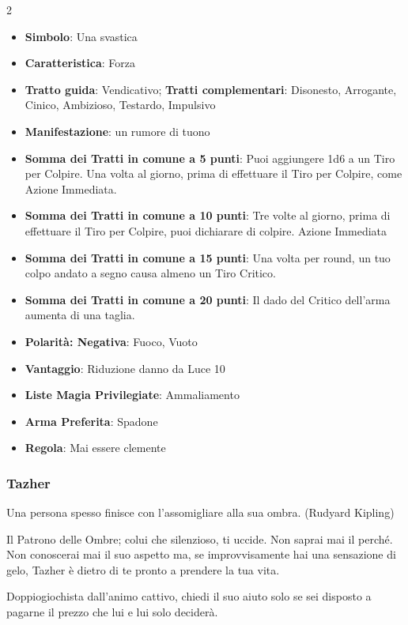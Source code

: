 \begin{multicols}{2}
\begin{itemize}[leftmargin=*] \setlength{\itemsep}{0pt}
\item \textbf{Simbolo}: Una svastica
\item \textbf{Caratteristica}: Forza
\item \textbf{Tratto guida}: Vendicativo; \textbf{Tratti complementari}: Disonesto, Arrogante, Cinico, Ambizioso, Testardo, Impulsivo
\item \textbf{Manifestazione}: un rumore di tuono
\item \textbf{Somma dei Tratti in comune a 5 punti}: Puoi aggiungere 1d6 a un Tiro per Colpire. Una volta al giorno, prima di effettuare il Tiro per Colpire, come Azione Immediata.
\item \textbf{Somma dei Tratti in comune a 10 punti}: Tre volte al giorno, prima di effettuare il Tiro per Colpire, puoi dichiarare di colpire. Azione Immediata
\item \textbf{Somma dei Tratti in comune a 15 punti}: Una volta per round, un tuo colpo andato a segno causa almeno un Tiro Critico.
\item \textbf{Somma dei Tratti in comune a 20 punti}: Il dado del Critico dell'arma aumenta di una taglia.
\item \textbf{Polarità: Negativa}: Fuoco, Vuoto
\item \textbf{Vantaggio}: Riduzione danno da Luce 10
\item \textbf{Liste Magia Privilegiate}: Ammaliamento
\item \textbf{Arma Preferita}: Spadone
\item \textbf{Regola}: Mai essere clemente
\end{itemize}

\subsubsection{Tazher}\label{tazher}\hypertarget{tazher}{}

\begin{enfasi}{
Una persona spesso finisce con l'assomigliare alla sua ombra. (Rudyard Kipling)
}\end{enfasi}

Il Patrono delle Ombre; colui che silenzioso, ti uccide. Non saprai mai il perché. Non conoscerai mai il suo aspetto ma, se improvvisamente hai una sensazione di gelo, Tazher è dietro di te pronto a prendere la tua vita.

Doppiogiochista dall'animo cattivo, chiedi il suo aiuto solo se sei disposto a pagarne il prezzo che lui e lui solo deciderà.


\end{multicols}
